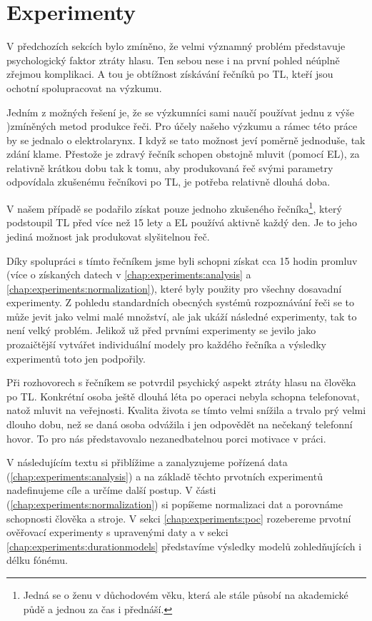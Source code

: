 \chapter{Experimenty}
\label{chap:experiments}

V předchozích sekcích bylo zmíněno, že velmi významný problém představuje psychologický faktor ztráty hlasu. Ten sebou nese i na první pohled néúplně zřejmou komplikaci. A tou je obtížnost získávání řečníků po TL, kteří jsou ochotní spolupracovat na výzkumu.

Jedním z možných řešení je, že se výzkumníci sami naučí používat jednu z výše  )zmíněných metod produkce řeči. Pro účely našeho výzkumu a rámec této práce by se jednalo o elektrolarynx. I když se tato možnost jeví poměrně jednoduše, tak zdání klame. Přestože je zdravý řečník schopen obstojně mluvit (pomocí EL), za relativně krátkou dobu tak k tomu, aby produkovaná řeč svými parametry odpovídala zkušenému řečníkovi po TL, je potřeba relativně dlouhá doba.

V našem případě se podařilo získat pouze jednoho zkušeného řečníka\footnote{Jedná se o ženu v důchodovém věku, která ale stále působí na akademické půdě a jednou za čas i přednáší.}, který podstoupil TL před více než 15 lety a EL používá aktivně každý den. Je to jeho jediná možnost jak produkovat slyšitelnou řeč.

Díky spolupráci s tímto řečníkem jsme byli schopni získat cca 15 hodin promluv (více o získaných datech v \ref{chap:experiments:analysis} a \ref{chap:experiments:normalization}), které byly použity pro všechny dosavadní experimenty. Z pohledu standardních obecných systémů rozpoznávání řeči se to může jevit jako velmi malé množství, ale jak ukáží následné experimenty, tak to není velký problém. Jelikož už před prvními experimenty se jevilo jako prozaičtější vytvářet individuální modely pro každého řečníka a výsledky experimentů toto jen podpořily.

Při rozhovorech s řečníkem se potvrdil psychický aspekt ztráty hlasu na člověka po TL. Konkrétní osoba ještě dlouhá léta po operaci nebyla schopna telefonovat, natož mluvit na veřejnosti. Kvalita života se tímto velmi snížila a trvalo prý velmi dlouho dobu, než se daná osoba odvážila i jen odpovědět na nečekaný telefonní hovor. To pro nás představovalo nezanedbatelnou porci motivace v práci.

V následujícím textu si přiblížime a zanalyzujeme pořízená data (\ref{chap:experiments:analysis}) a na základě těchto prvotních experimentů nadefinujeme cíle a určíme další postup. V části (\ref{chap:experiments:normalization}) si popíšeme normalizaci dat a porovnáme schopnosti člověka a stroje. V sekci \ref{chap:experiments:poc} rozebereme prvotní ověřovací experimenty s upravenými daty a v sekci \ref{chap:experiments:durationmodels} představíme výsledky modelů zohledňujících i délku fónému.

